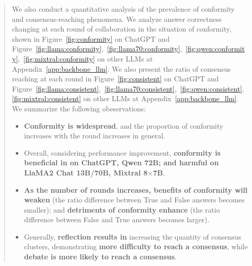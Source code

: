 \documentclass[11pt]{article}
\begin{document}
\begin{abstract}
We also conduct a quantitative analysis of the prevalence of conformity and consensus-reaching phenomena. %
We analyze answer correctness changing at each round of collaboration in the situation of conformity, shown in Figure~\ref{fig:conformity} on ChatGPT and Figure~\ref{fig:llama:conformity},~\ref{fig:llama70:conformity},~\ref{fig:qwen:conformity},~\ref{fig:mixtral:conformity} on other LLMs at Appendix~\ref{app:backbone_llm}. 
We also present the ratio of consensus reaching at each round in Figure~\ref{fig:consistent} on ChatGPT and Figure~\ref{fig:llama:consistent},~\ref{fig:llama70:consistent},~\ref{fig:qwen:consistent},~\ref{fig:mixtral:consistent} on other LLMs at Appendix~\ref{app:backbone_llm}. 
We summarize the following obeservations: 

\begin{itemize}
\setlength{\itemsep}{2pt}
\setlength{\parsep}{2pt}
\setlength{\parskip}{2pt}

    \item \textbf{Conformity is widespread}, and the proportion of conformity increases with the round increases in general. 

    \item Overall, considering performance improvement, \textbf{conformity is beneficial in on ChatGPT, Qwen 72B; and harmful on LlaMA2 Chat 13B/70B, Mixtral 8$\times$7B}. 

    \item \textbf{As the number of rounds increases, benefits of conformity will weaken} (the ratio difference between True and False answers becomes smaller); and \textbf{detriments of conformity enhance} (the ratio difference between False and True answers becomes larger). 

    \item Generally, \textbf{reflection results in} increasing the quantity of consensus clusters, demonstrating \textbf{more difficulty to reach a consensus}, while \textbf{debate is more likely to reach a consensus}. 
\end{itemize}





\end{abstract}
\end{document}
